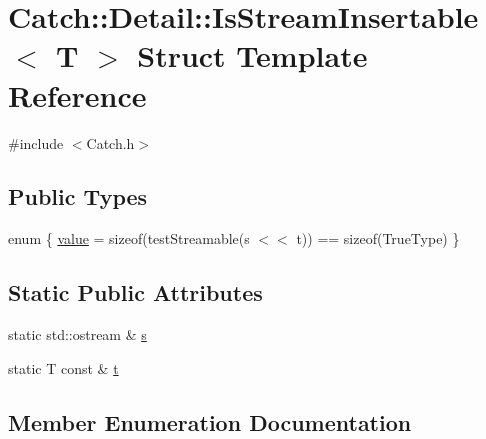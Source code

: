 \hypertarget{struct_catch_1_1_detail_1_1_is_stream_insertable}{}\section{Catch\+:\+:Detail\+:\+:Is\+Stream\+Insertable$<$ T $>$ Struct Template Reference}
\label{struct_catch_1_1_detail_1_1_is_stream_insertable}


{\ttfamily \#include $<$Catch.\+h$>$}

\subsection*{Public Types}
\begin{DoxyCompactItemize}
\item 
enum \{ \hyperlink{struct_catch_1_1_detail_1_1_is_stream_insertable_a6f025e88a7c7d52ced3d9d6c9246076ea765a324929702bfce2969fc19fc4f926}{value} = sizeof(test\+Streamable(s $<$$<$ t)) == sizeof(True\+Type)
 \}
\end{DoxyCompactItemize}
\subsection*{Static Public Attributes}
\begin{DoxyCompactItemize}
\item 
static std\+::ostream \& \hyperlink{struct_catch_1_1_detail_1_1_is_stream_insertable_abe3d3c8e5d85665747faafffc9a96b00}{s}
\item 
static T const \& \hyperlink{struct_catch_1_1_detail_1_1_is_stream_insertable_a7d2a3da978b6736667a7b2f6d51f507f}{t}
\end{DoxyCompactItemize}


\subsection{Member Enumeration Documentation}

